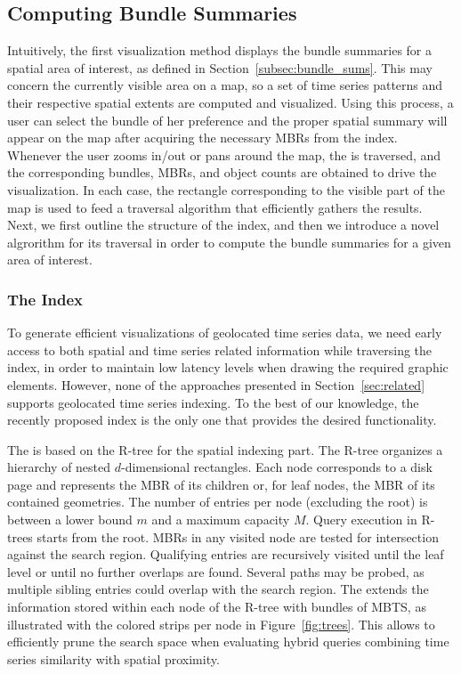 \subsection{Computing Bundle Summaries}
\label{sec:bundles_summary}

Intuitively, the first visualization method displays the bundle summaries for a spatial area of interest, as defined in Section~\ref{subsec:bundle_sums}. This may concern the currently visible area on a map, so a set of time series patterns and their respective spatial extents are computed and visualized. Using this process, a user can select the bundle of her preference and the proper spatial summary will appear on the map after acquiring the necessary MBRs from the \btsr index. Whenever the user zooms in/out or pans around the map, the \btsr is traversed, and the corresponding bundles, MBRs, and object counts are obtained to drive the visualization. In each case, the rectangle corresponding to the visible part of the map is used to feed a traversal algorithm that efficiently gathers the results. Next, we first outline the structure of the \btsr index, and then we introduce a novel algrorithm for its traversal in order to compute the bundle summaries for a given area of interest.




\subsubsection{The \btsr Index}
\label{subsec:btsr}

To generate efficient visualizations of geolocated time series data, we need early access to both spatial and time series related information while traversing the index, in order to maintain low latency levels when drawing the required graphic elements. However, none of the approaches presented in Section~\ref{sec:related} supports geolocated time series indexing. To the best of our knowledge, the recently proposed \btsr index \cite{chatzig17btsr} is the only one that provides the desired functionality. 

The \btsr is based on the R-tree \cite{Guttman1984} for the spatial indexing part. The R-tree organizes a hierarchy of nested $d$-dimensional rectangles. Each node corresponds to a disk page and represents the MBR of its children or, for leaf nodes, the MBR of its contained geometries. The number of entries per node (excluding the root) is between a lower bound $m$ and a maximum capacity $M$. Query execution in R-trees starts from the root. MBRs in any visited node are tested for intersection against the search region. Qualifying entries are recursively visited until the leaf level or until no further overlaps are found. Several paths may be probed, as multiple sibling entries could overlap with the search region. The \btsr extends the information stored within each node of the R-tree with bundles of MBTS, as illustrated with the colored strips per node in Figure~\ref{fig:trees}. This allows to efficiently prune the search space when evaluating hybrid queries combining time series similarity with spatial proximity.

